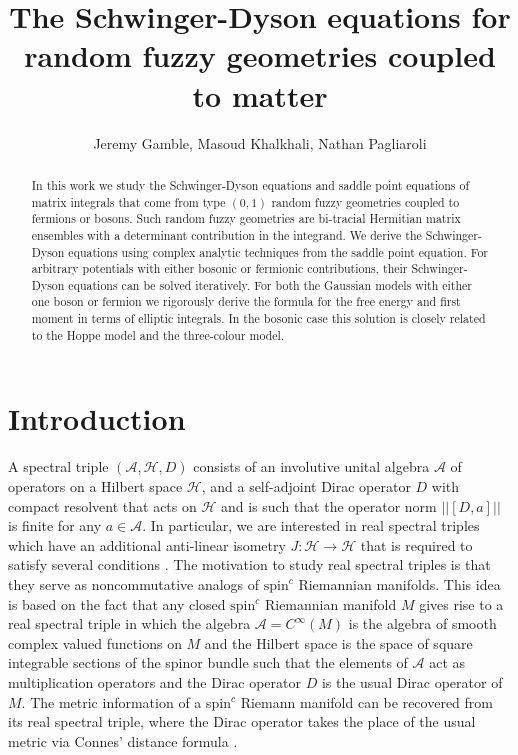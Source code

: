 \documentclass[10pt]{article}
\date
\title{The Schwinger-Dyson equations for random fuzzy geometries coupled to matter}
\author{Jeremy Gamble, Masoud Khalkhali, Nathan Pagliaroli}
\theoremstyle{plain}
\theoremstyle{definition}
\theoremstyle{plain}
\begin{document}
	\maketitle
	\begin{abstract}
In this work we study the Schwinger-Dyson equations and saddle point equations of matrix integrals that come from type $(0,1)$ random fuzzy geometries coupled to fermions or bosons. Such random fuzzy geometries are bi-tracial Hermitian matrix ensembles with a determinant contribution in the integrand. We derive the Schwinger-Dyson equations using complex analytic techniques from the saddle point equation. For arbitrary potentials with either bosonic or fermionic contributions, their Schwinger-Dyson equations can be solved iteratively.  For both the Gaussian models with either one boson or fermion we rigorously derive the formula for the free energy and first moment in terms of elliptic integrals. In the bosonic case this solution is closely related to the Hoppe model and the three-colour model.
	\end{abstract}
	\tableofcontents
	\section*{Introduction}

A spectral triple $(\mathcal{A},\mathcal{H},D)$ consists of an involutive unital algebra $\mathcal{A}$ of operators on a Hilbert space $\mathcal{H}$, and a self-adjoint Dirac operator $D$ with compact resolvent that acts on $\mathcal{H}$ and is such that the operator norm $||[D,a]||$ is finite for any $a \in \mathcal{A}$. In particular, we are interested in real spectral triples which have an additional anti-linear isometry $J: \mathcal{H} \xrightarrow{} \mathcal{H}$ that is required to satisfy several conditions \cite{varilly2006introduction}.  
The motivation to study real spectral triples is that they serve as noncommutative analogs of   $\text{spin}^c$  Riemannian manifolds. This idea is based on the fact that any closed $\text{spin}^c$ Riemannian manifold $M$ gives rise to a real spectral triple in which the algebra $\mathcal{A}= C^{\infty} (M)$ is the algebra of smooth complex valued functions on  $M$ and the Hilbert space is the space of square integrable sections of the spinor bundle such that the elements of $\mathcal{A}$ act as multiplication operators and the Dirac operator $D$ is the usual Dirac operator of $M$. The metric information of a spin$^{c}$ Riemann manifold can be recovered from its real spectral triple, where the Dirac operator takes the place of the usual metric via Connes' distance formula \cite{connes1992metric}. 
\end{document}
